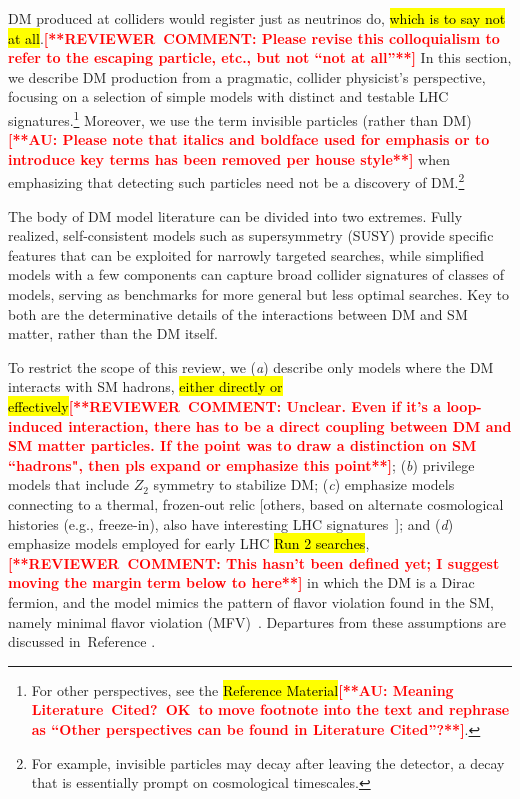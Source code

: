 \documentclass{ar-1col}
\newcommand{\IP}{invisible particle}
\begin{document}
DM produced at colliders would register just as neutrinos do,
\hl{which is to say not at all}.\textbf{\textcolor{red}{[**REVIEWER\ COMMENT: Please revise this colloquialism to refer to the escaping particle, etc., but not ``not at all''**]}} In this section, we describe DM
production from a pragmatic, collider physicist's perspective,
focusing on a selection of simple models with distinct and
testable LHC signatures.\footnote{For other perspectives, see the
\hl{Reference Material}\textbf{\textcolor{red}{[**AU: Meaning Literature\ Cited?\ OK\ to move footnote into the text and rephrase as ``Other perspectives can be found in Literature Cited''?**]}}.} Moreover, we use the term {invisible
particles} (rather than DM)\textbf{\textcolor{red}{[**AU: Please note that italics and boldface used for emphasis or to introduce key terms has been removed per house style**]}} when emphasizing that detecting such
particles need not be a discovery of DM.\footnote{For example,
{\IP}s may decay after leaving the detector, a decay that is
essentially prompt on cosmological timescales.}

The body of DM model literature can be divided into two extremes.
Fully realized, self-consistent models such as supersymmetry (SUSY) provide
specific features that can be exploited for narrowly targeted
searches, while simplified models with a few components can
capture broad collider signatures of classes of models, serving as
benchmarks for more general but less optimal searches. Key to both
are the determinative details of the interactions between DM
and SM matter, rather than the DM itself.

To restrict the scope of this review,
we (\textit{a}) describe only models where the DM interacts with SM hadrons, \hl{either directly or effectively}\textbf{\textcolor{red}{[**REVIEWER\ COMMENT: Unclear.  Even if it's a loop-induced interaction, there has to be a direct coupling between DM and SM matter particles.  If the point was to draw a distinction on SM ``hadrons", then pls expand or emphasize this point**]}}; (\textit{b}) privilege models that include $Z_2$ symmetry to stabilize DM; (\textit{c}) emphasize models connecting to a thermal, frozen-out relic [others, based on alternate cosmological histories (e.g.,
freeze-in), also have interesting LHC
signatures~\cite{Bernal:2017kxu}]; and (\textit{d}) emphasize models employed for early LHC \hl{Run 2 searches},\textbf{\textcolor{red}{[**REVIEWER\ COMMENT: This hasn't been defined yet; I suggest moving the margin term below to here**]}} in which
the DM is a Dirac fermion, and the model mimics the pattern of
flavor violation found in the SM, namely minimal flavor violation
(MFV)~\cite{DAmbrosio:2002vsn}. Departures from these assumptions are discussed in~Reference .
\end{document}
